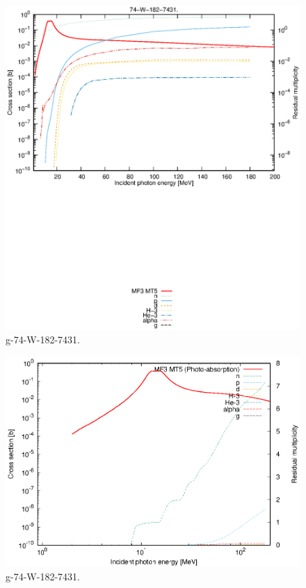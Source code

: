 \begin{figure}
 \includegraphics[width=\linewidth]{eps/g_74-W-182_7431.eps}
  \caption{g-74-W-182-7431.}
\end{figure}
\newpage \clearpage

\begin{figure}
 \includegraphics[width=\linewidth]{eps-log/g_74-W-182_7431.eps}
 \caption{g-74-W-182-7431.}
\end{figure}
\newpage \clearpage


